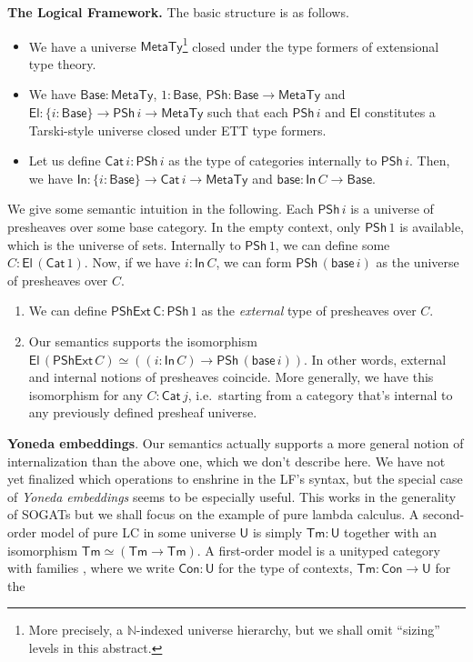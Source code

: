 \documentclass{easychair}
\newcommand{\msf}[1]{{\mathsf{#1}}}
\newcommand{\mbb}[1]{\mathbb{#1}}
\newcommand{\MetaTy}{\msf{MetaTy}}
\newcommand{\Base}{\msf{Base}}
\newcommand{\PSh}{\msf{PSh}}
\newcommand{\El}{\msf{El}}
\newcommand{\Cat}{\msf{Cat}}
\newcommand{\In}{\msf{In}}
\newcommand{\base}{\msf{base}}
\newcommand{\Tm}{\msf{Tm}}
\newcommand{\U}{\msf{U}}
\newcommand{\Con}{\msf{Con}}
\begin{document}
\noindent\textbf{The Logical Framework.} The basic structure is as follows.
\begin{itemize}
\item We have a universe $\MetaTy$\footnote{More precisely, a $\mbb{N}$-indexed universe
hierarchy, but we shall omit ``sizing'' levels in this abstract.} closed under the type formers
  of extensional type theory.
\item We have $\Base : \MetaTy$, $1 : \Base$, $\PSh : \Base \to \MetaTy$ and $\El : \{i :
  \Base\} \to \PSh\,i \to \MetaTy$ such that each $\PSh\,i$ and $\El$ constitutes
  a Tarski-style universe closed under ETT type formers.
\item Let us define $\Cat\,i : \PSh\,i$ as the type of categories internally to
  $\PSh\,i$. Then, we have $\In : \{i : \Base\} \to \Cat\,i \to \MetaTy$ and $\msf{base} : \In\,C \to \Base$.
\end{itemize}
We give some semantic intuition in the following. Each $\PSh\,i$ is a universe
of presheaves over some base category. In the empty context, only $\PSh\,1$ is
available, which is the universe of sets. Internally to $\PSh\,1$, we can define
some $C : \El\,(\Cat\,1)$. Now, if we have $i : \In\,C$, we can form $\PSh\,(\base\,i)$
as the universe of presheaves over $C$.
\begin{enumerate}
\item We can define $\msf{PShExt\,C} : \PSh\,1$ as the \emph{external} type of presheaves over $C$.
\item Our semantics supports the isomorphism $\El\,(\msf{PShExt}\,C) \simeq ((i
  : \In\,C) \to \PSh\,(\base\,i))$.  In other words, external and internal
  notions of presheaves coincide. More generally, we have this isomorphism for
  any $C : \Cat\,j$, i.e.\ starting from a category that's internal to any
  previously defined presheaf universe.
\end{enumerate}
\textbf{Yoneda embeddings}. Our semantics actually supports a more general
notion of internalization than the above one, which we don't describe here. We
have not yet finalized which operations to enshrine in the LF's syntax, but the
special case of \emph{Yoneda embeddings} seems to be especially useful. This
works in the generality of SOGATs but we shall focus on the example of pure
lambda calculus. A second-order model of pure LC in some universe $\U$ is simply
$\Tm : \U$ together with an isomorphism $\Tm \simeq (\Tm \to \Tm)$. A
first-order model is a unityped category with families \cite{cwfs}, where we
write $\msf{Con} : \U$ for the type of contexts, $\Tm : \Con \to \U$ for the
\end{document}
